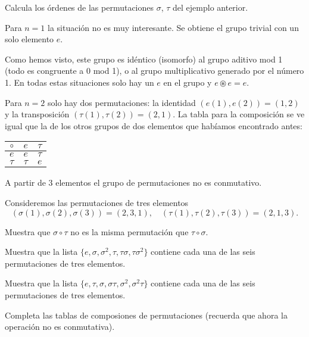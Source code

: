 \begin{ejercicio}
Calcula los órdenes de las permutaciones $\sigma$, $\tau$ del ejemplo anterior. 
\end{ejercicio}

Para $n=1$ la situación no es muy interesante. Se obtiene el grupo trivial con un solo elemento $e$.

Como hemos visto, este grupo es idéntico (isomorfo) al grupo aditivo mod 1 (todo es congruente a 0 mod 1), o al grupo multiplicativo generado por el número 1. En todas estas situaciones solo hay un $e$ en el grupo y $e\circledast e=e$.

Para $n=2$ solo hay dos permutaciones: la identidad $(e(1),e(2))=(1,2)$ y la transposición $(\tau(1),\tau(2))=(2,1)$. La tabla para la composición se ve igual que la de los otros grupos de dos elementos que habíamos encontrado antes:

\begin{tabular}{|c||c|c|} 
 \hline
  $\circ$ & $e$ & $\tau$ \\ 
  \hline
  \hline
  $e$ & $e$ & $\tau$  \\ 
  \hline
  $\tau$ & $\tau$ & $e$ \\ 
  \hline
\end{tabular}

A partir de $3$ elementos el grupo de permutaciones no es conmutativo.

\begin{ejercicio}
Consideremos las permutaciones de tres elementos $$(\sigma(1),\sigma(2),\sigma(3))=(2,3,1),\quad (\tau(1), \tau(2), \tau(3))=(2,1,3).$$

Muestra que $\sigma \circ \tau$ no es la misma permutación que $\tau \circ \sigma$.

Muestra que la lista $\{e,\sigma, \sigma^2,\tau, \tau \sigma, \tau \sigma^2 \}$ contiene  cada una de las seis permutaciones de tres elementos.

Muestra que la lista $\{e,\tau, \sigma, \sigma\tau, \sigma^2, \sigma^2\tau \}$ contiene cada una de las seis permutaciones de tres elementos.

Completa las tablas de composiones de permutaciones (recuerda que ahora la operación no es conmutativa).

\end{ejercicio}

